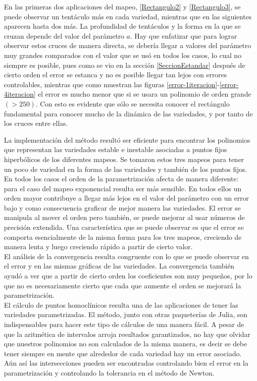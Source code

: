 En las primeras dos aplicaciones del mapeo, \ref{Rectangulo2} y \ref{Rectangulo3}, se puede observar un tentáculo más en cada variedad, mientras que en las siguientes aparecen hasta dos más. La profundidad de tentáculos y la forma en la que se cruzan depende del valor del parámetro $a$. Hay que enfatizar que para lograr observar estos cruces de manera directa, se debería llegar a valores del parámetro muy grandes comparados con el valor que se usó en todos los casos, lo cual no siempre es posible, pues como se vio en la sección \ref{SeccionEstandar} después de cierto orden el error se estanca y no es posible llegar tan lejos con errores controlables, mientras que como muestran las figuras \ref{error-1iteracion}-\ref{error-4iteracion} el error es mucho menor que si se usara un polinomio de orden grande $(>250)$. Con esto es evidente que sólo se necesita conocer el rectángulo fundamental para conocer mucho de la dinámica de las variedades, y por tanto de los cruces entre ellas. 


La implementación del método resultó ser eficiente para encontrar los polinomios que representan las variedades estable e inestable asociadas a puntos fijos hiperbólicos de los diferentes mapeos. Se tomaron estos tres mapeos para tener un poco de variedad en la forma de las variedades y también de los puntos fijos. En todos los casos el orden de la parametrización afecta de manera diferente: para el caso del mapeo exponencial resulta ser más sensible. En todos ellos un orden mayor contribuye a llegar más lejos en el valor del parámetro con un error bajo y como consecuencia graficar de mejor manera las variedades. El error se manipula al mover el orden pero también, se puede mejorar al usar números de precisión extendida. Una característica que se puede observar es que el error se comporta esencialmente de la misma forma para los tres mapeos, creciendo de manera lenta y luego creciendo rápido a partir de cierto valor. \\


El análisis de la convergencia resulta congruente con lo que se puede observar en el error y en las mismas gráficas de las variedades. La convergencia también ayudó a ver que a partir de cierto orden los coeficientes son muy pequeños, por lo que no es necesariamente cierto que cada que aumente el orden se mejorará la parametrización.\\


El cálculo de puntos homoclínicos resulta una de las aplicaciones de tener las variedades parametrizadas. El método, junto con otras paqueterías de Julia, son in\-dis\-pen\-sa\-bles para hacer este tipo de cálculos de una manera fácil. A pesar de que la aritmética de intervalos arroja resultados garantizados, no hay que olvidar que nuestros polinomios no son calculados de la misma manera, es decir se debe tener siempre en mente que alrededor de cada variedad hay un error asociado. Aún así las intersecciones pueden ser encontradas controlando bien el error en la parametrización y controlando la tolerancia en el método de Newton.